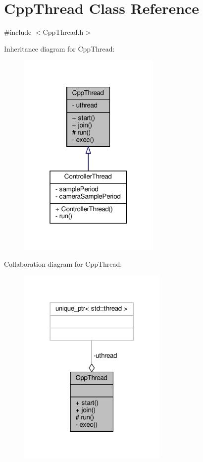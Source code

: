 \hypertarget{classCppThread}{}\section{Cpp\+Thread Class Reference}
\label{classCppThread}


{\ttfamily \#include $<$Cpp\+Thread.\+h$>$}



Inheritance diagram for Cpp\+Thread\+:\nopagebreak
\begin{figure}[H]
\begin{center}
\leavevmode
\includegraphics[width=196pt]{classCppThread__inherit__graph}
\end{center}
\end{figure}


Collaboration diagram for Cpp\+Thread\+:\nopagebreak
\begin{figure}[H]
\begin{center}
\leavevmode
\includegraphics[width=206pt]{classCppThread__coll__graph}
\end{center}
\end{figure}
